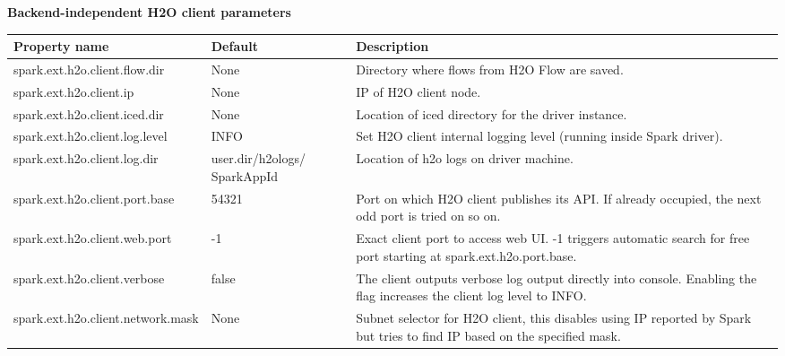 \textbf{Backend-independent H2O client parameters}
\begin{footnotesize}
\begin{longtable}[!ht]{l p{3.0cm} p{3.0cm}}
\toprule
Property name & Default  & Description \\
\midrule

spark.ext.h2o.client.flow.dir & None & Directory where flows from H2O Flow are saved. \\ \addlinespace

spark.ext.h2o.client.ip & None & IP of H2O client node. \\ \addlinespace

spark.ext.h2o.client.iced.dir & None & Location of iced directory for the driver instance. \\ \addlinespace

spark.ext.h2o.client.log.level & INFO & Set H2O client internal logging level (running inside Spark driver).\\  \addlinespace

spark.ext.h2o.client.log.dir & {user.dir}/h2ologs/ {SparkAppId} & Location of h2o logs on driver machine.\\  \addlinespace

spark.ext.h2o.client.port.base & 54321 & Port on which H2O client publishes its API. If already occupied, the next odd port is tried on so on. \\ \addlinespace

spark.ext.h2o.client.web.port & -1 & Exact client port to access web UI. -1 triggers automatic search for free port starting at spark.ext.h2o.port.base.\\ \addlinespace

spark.ext.h2o.client.verbose & false & The client outputs verbose log output directly into console. Enabling the flag increases the client log level to INFO. \\ \addlinespace

spark.ext.h2o.client.network.mask & None & Subnet selector for H2O client, this disables using IP reported by Spark but tries to find IP based on the specified mask. \\

\bottomrule
\end{longtable}
\end{footnotesize}

